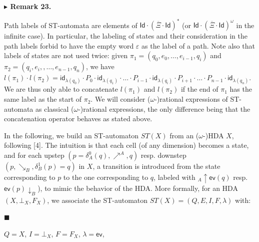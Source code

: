 \documentclass[10pt,a4paper]{article}
\begin{document}
 
\par\medskip\noindent\textbf{$\blacktriangleright$ Remark 23.}\par
 
 
Path labels of ST-automata are elements of $\mathsf{Id}\cdot(\overline{\Xi}\cdot\mathsf{Id})^{*}$ (or $\mathsf{Id}\cdot(\overline{\Xi}\cdot\mathsf{Id})^{\omega}$ in the infinite case). In particular, the labeling of states and their consideration in the path labels forbid to have the empty word $\varepsilon$ as the label of a path. Note also that labels of states are not used twice: given $\pi_{1}=(q_{0},e_{0},\dots,e_{i-1},q_{i})$ and $\pi_{2}=(q_{i},e_{i},,\dots,e_{n-1},q_{n})$, we have $l(\pi_{1})\cdot l(\pi_{2})=\mathsf{id}_{\lambda(q_{0})}\cdot P_{0}\cdot\mathsf{id}_{\lambda(q_{1})}\cdot\ldots\cdot P_{i-1}\cdot\mathsf{id}_{\lambda(q_{i})}\cdot P_{i+1}\cdot\ldots\cdot P_{n-1}\cdot\mathsf{id}_{\lambda(q_{n})}$. We are thus only able to concatenate $l(\pi_{1})$ and $l(\pi_{2})$ if the end of $\pi_{1}$ has the same label as the start of $\pi_{2}$. We will consider ($\omega$-)rational expressions of ST-automata as classical ($\omega$-)rational expressions, the only difference being that the concatenation operator behaves as stated above.\par
 
 
 
 
In the following, we build an ST-automaton $ST(X)$ from an ($\omega$-)HDA $X$, following [4]. The intuition is that each cell (of any dimension) becomes a state, and for each upstep $(p=\delta_{A}^{0}(q),{\mathrel{\nearrow^{A}}},q)$ resp. downstep $(p,\mathrel{\searrow_{B}},\delta_{B}^{1}(p)=q)$ in $X$, a transition is introduced from the state corresponding to $p$ to the one corresponding to $q$, labeled with ${}_{A\!}{\uparrow}{\mathsf{ev}(q)}$ resp. ${\mathsf{ev}(p)}{\downarrow}_{B}$), to mimic the behavior of the HDA. More formally, for an HDA $(X,\bot_{X},F_{X})$, we associate the ST-automaton $ST(X)=(Q,E,I,F,\lambda)$ with:\par
  
\par\noindent  $\blacksquare$ 
 
$Q=X$, $I=\bot_{X}$, $F=F_{X}$, $\lambda=\mathsf{ev}$,\par
 
\end{document}
